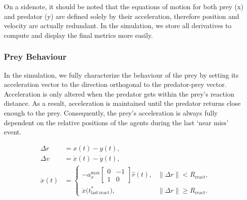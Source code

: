 \documentclass[10pt, twocolumn]{article}
\begin{document}
    On a sidenote, it should be noted that the equations of motion for both prey (x) and predator (y) are defined solely by their acceleration, therefore position and velocity are actually redundant. In the simulation, we store all derivatives to compute and display the final metrics more easily.

    \subsubsection{Prey Behaviour}
    In the simulation, we fully characterize the behaviour of the prey by setting its acceleration vector to the direction orthogonal to the predator-prey vector. Acceleration is only altered when the predator gets within the prey's reaction distance. As a result, acceleration is maintained until the predator returns close enough to the prey. Consequently, the prey's acceleration is always fully dependent on the relative positions of the agents during the last `near miss' event.

    \[
      \begin{aligned}
        \Delta r &= x(t) - y(t), \\
        \Delta v &= \dot{x}(t) - \dot{y}(t), \\
        \ddot{x}(t) &=
        \begin{cases}
          - a_x^{\max}
          \begin{bmatrix}
            0 & -1 \\
            1 & 0
          \end{bmatrix}
          \hat{r}(t), & \|\Delta r\| < R_{\mathrm{react}}, \\[1.2em]
          \ddot{x}\bigl(t^*_{\mathrm{last\,react}}\bigr), & \|\Delta r\| \ge R_{\mathrm{react}}.
        \end{cases}
      \end{aligned}
    \]
\end{document}
